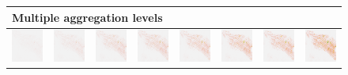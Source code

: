 \documentclass{itatnew}
\begin{document}
\begin{figure}[htp]
  \centering

  \begin{tabular}{cccccccc}
    \hline
    \multicolumn{8}{l}{Multiple aggregation levels} \\
    \hline
    \includegraphics[width=4.6em]{images/gen-rawdata-1}&
    \includegraphics[width=4.6em]{images/gen-rawdata-2}&
    \includegraphics[width=4.6em]{images/gen-rawdata-3}&
    \includegraphics[width=4.6em]{images/gen-rawdata-4}&
    \includegraphics[width=4.6em]{images/gen-rawdata-5}&
    \includegraphics[width=4.6em]{images/gen-rawdata-6}&
    \includegraphics[width=4.6em]{images/gen-rawdata-7}&
    \includegraphics[width=4.6em]{images/gen-rawdata-8}
  \end{tabular}

\end{figure}
\end{document}
